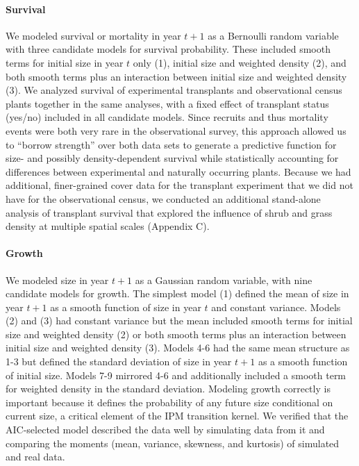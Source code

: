\documentclass[11pt]{article}\usepackage[]{graphicx}\usepackage[]{color}
\begin{document}
\paragraph{Survival}
We modeled survival or mortality in year $t+1$ as a Bernoulli random variable with three candidate models for survival probability.
These included smooth terms for initial size in year $t$ only (1), initial size and weighted density (2), and both smooth terms plus an interaction between initial size and weighted density (3). 
We analyzed survival of experimental transplants and observational census plants together in the same analyses, with a fixed effect of transplant status (yes/no) included in all candidate models. 
Since recruits and thus mortality events were both very rare in the observational survey, this approach allowed us to ``borrow strength'' over both data sets to generate a predictive function for size- and possibly density-dependent survival while statistically accounting for differences between experimental and naturally occurring plants. 
Because we had additional, finer-grained cover data for the transplant experiment that we did not have for the observational census, we conducted an additional stand-alone analysis of transplant survival that explored the influence of shrub and grass density at multiple spatial scales (Appendix C).

\paragraph{Growth}
We modeled size in year $t+1$ as a Gaussian random variable, with nine candidate models for growth.
The simplest model (1) defined the mean of size in year $t+1$ as a smooth function of size in year $t$ and constant variance. 
Models (2) and (3) had constant variance but the mean included smooth terms for initial size and weighted density (2) or both smooth terms plus an interaction between initial size and weighted density (3).
Models 4-6 had the same mean structure as 1-3 but defined the standard deviation of size in year $t+1$ as a smooth function of initial size. 
Models 7-9 mirrored 4-6 and additionally included a smooth term for weighted density in the standard deviation. 
Modeling growth correctly is important because it defines the probability of any future size conditional on current size, a critical element of the IPM transition kernel.
We verified that the AIC-selected model described the data well by simulating data from it and comparing the moments (mean, variance, skewness, and kurtosis) of simulated and real data.
\end{document}
